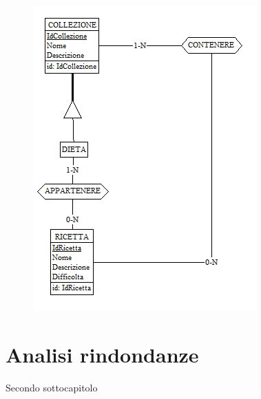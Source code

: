 ﻿\documentclass[a4paper,12pt]{report}
\begin{document}
\begin{figure}[h!]
    \centering
    \includegraphics[width=0.5\linewidth]{app_images/gerarchia_collezione.png}
\end{figure}
\section{Analisi rindondanze}
Secondo sottocapitolo
\end{document}
